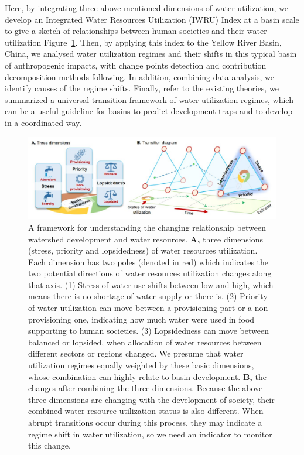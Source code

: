 \documentclass[9pt, twocolumn, twoside, lineno]{pnas-new}
\begin{document}
Here, by integrating three above mentioned dimensions of water utilization, we develop an Integrated Water Resources Utilization (IWRU) Index at a basin scale to give a sketch of relationships between human societies and their water utilization Figure~\ref{fig:framework}.
Then, by applying this index to the Yellow River Basin, China, we analysed water utilization regimes and their shifts in this typical basin of anthropogenic impacts, with change points detection and contribution decomposition methods following.
In addition, combining data analysis, we identify causes of the regime shifts. 
Finally, refer to the existing theories, we summarized a universal transition framework of water utilization regimes, which can be a useful guideline for basins to predict development traps and to develop in a coordinated way.


\begin{figure}%
	\centering
	\includegraphics[width=\linewidth]{../../figures/main/framework.jpg}
	\caption{
		A framework for understanding the changing relationship between watershed development and water resources.
		\textbf{A,} three dimensions (stress, priority and lopsidedness) of water resources utilization. Each dimension has two poles (denoted in red) which indicates the two potential directions of water resources utilization changes along that axis. (1) Stress of water use shifts between low and high, which means there is no shortage of water supply or there is. (2) Priority of water utilization can move between a provisioning part or a non-provisioning one, indicating how much water were used in food supporting to human societies. (3) Lopsidedness can move between balanced or lopsided, when allocation of water resources between different sectors or regions changed. We presume that water utilization regimes equally weighted by these basic dimensions, whose combination can highly relate to basin development. 
		\textbf{B,} the changes after combining the three dimensions. Because the above three dimensions are changing with the development of society, their combined water resource utilization status is also different. When abrupt transitions occur during this process, they may indicate a regime shift in water utilization, so we need an indicator to monitor this change.
	}
	\label{fig:framework}
\end{figure}
\end{document}
